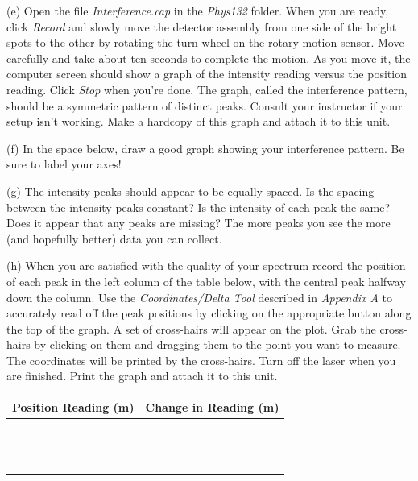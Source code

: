 (e) Open the file {\it Interference.cap} in the {\it Phys132} folder. 
When you are ready, click {\it Record} and slowly move the
detector assembly from one side of the bright spots to the other by rotating the turn wheel on the rotary motion
sensor. Move carefully and take about ten seconds to complete the motion. As you move it, the computer screen
should show a graph of the intensity reading versus the position reading. Click {\it Stop} when you’re done. The
graph, called the interference pattern, should be a symmetric pattern of distinct peaks. Consult your instructor
if your setup isn’t working.
Make a hardcopy of this graph and attach it to this unit.

(f) In the space below, draw a good graph showing your interference pattern. Be sure to label your axes!
\vspace{25mm}

(g) The intensity peaks should appear to be equally spaced. 
Is the spacing between the intensity peaks constant? Is the intensity
of each peak the same? Does it appear that any peaks are missing?
The more peaks you see the more (and hopefully better) data you can collect.
\vspace{12mm}

(h) When you are satisfied with the quality of your spectrum record the 
position of each peak in the left column of the table below, with the central 
peak halfway down the column. Use the {\it Coordinates/Delta Tool} 
described in {\it Appendix A} to accurately read off 
the peak positions by clicking on the appropriate button along the top of the 
graph. A set of cross-hairs will appear on the plot. Grab the cross-hairs by 
clicking on them and dragging them to the point you want to measure.
The coordinates will be printed by the cross-hairs.
Turn off the laser when you are finished. Print the graph and attach it to this unit.

\vspace{0.3cm}
{\centering \begin{tabular}{|c|c|}
\hline 
Position Reading (m)&
Change in Reading (m)\\
\hline
\hline 
&
\\
\hline 
&
\\
\hline 
&
\\
\hline 
&
\\
\hline 
&
\\
\hline 
&
\\
\hline 
&
\\
\hline
&
\\
\hline
&
\\
\hline
&
\\
\hline
&
\\
\hline
&
\\
\hline
&
\\
\hline
\end{tabular}\par}
\vspace{0.3cm}

